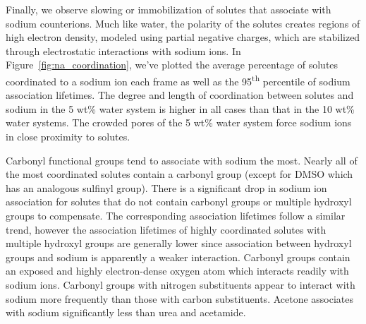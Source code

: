 \documentclass[journal=jpcbfk,manuscript=article]{achemso}
\begin{document}
  Finally, we observe slowing or immobilization of solutes that associate with
  sodium counterions. Much like water, the polarity of the solutes creates 
  regions of high electron density, modeled using partial negative charges, 
  which are stabilized through electrostatic interactions with sodium ions. 
  In Figure~\ref{fig:na_coordination}, we've plotted the average percentage
  of solutes coordinated to a sodium ion each frame as well as the
  95\textsuperscript{th} percentile of sodium association lifetimes. The degree and length of 
  coordination between solutes and sodium in the 5 wt\% water system is higher
  in all cases than that in the 10 wt\% water systems. The crowded pores of 
  the 5 wt\% water system force sodium ions in close proximity to solutes. 
  
  Carbonyl functional groups tend to associate with sodium the most. Nearly
  all of the most coordinated solutes contain a carbonyl group (except for 
  DMSO which has an analogous sulfinyl group). There is a significant
  drop in sodium ion association for solutes that do not contain carbonyl 
  groups or multiple hydroxyl groups to compensate. The corresponding association
  lifetimes follow a similar trend, however the association lifetimes of highly coordinated 
  solutes with multiple hydroxyl groups are generally lower since association
  between hydroxyl groups and sodium is apparently a weaker interaction. Carbonyl
  groups contain an exposed and highly electron-dense oxygen atom which interacts
  readily with sodium ions. Carbonyl groups with nitrogen substituents appear
  to interact with sodium more frequently than those with carbon substituents. 
  Acetone associates with sodium significantly less than urea and acetamide. 

\end{document}

